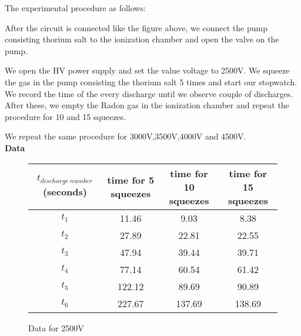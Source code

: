 \documentclass[10pt,a4paper]{article}
\begin{document}
{\par The experimental procedure as follows:
\\[\baselineskip]
\par After the circuit is connected like the figure above, we connect the pump consisting thorium salt to the ionization chamber and open the valve on the pump.
\\[\baselineskip]
\par We open the HV power supply and set the value voltage to 2500V. We squeeze the gas in the pump consisting the thorium salt 5 times and start our stopwatch. We record the time of the every discharge until we observe couple of discharges. After these, we empty the Radon gas in the ionization chamber and repeat the procedure for 10 and 15 squeezes.
\\[\baselineskip]
\par We repeat the same procedure for 3000V,3500V,4000V and 4500V.
\\[\baselineskip]
 \textbf{Data}\\[\baselineskip]
 \begin{center}
 	\begin{figure} [H]
 	\advance\leftskip-2cm
 	\begin{tabular}{|c |c| c|c|} \hline
 		$t_{discharge\ number}$ (seconds) &  time for 5 squeezes & time for 10 squeezes & time for 15 squeezes \\ [0.5ex] 
 		\hline
 		$t_1$ & 11.46 & 9.03  &8.38 \\ 
 		\hline
 		$t_2$  & 27.89 &22.81  &22.55 \\
 		\hline
 		$t_3$ & 47.94 & 39.44&39.71 \\
 		\hline
 		$t_4$ & 77.14 & 60.54& 61.42\\
 		\hline
 	$t_5$ & 122.12 & 89.69&90.89\\
 		\hline
 			$t_6$ & 227.67 & 137.69 & 138.69\\
 		\hline
 	\end{tabular}
 \caption{Data for 2500V}
\end{figure}
 \end{center}

}
\end{document}
